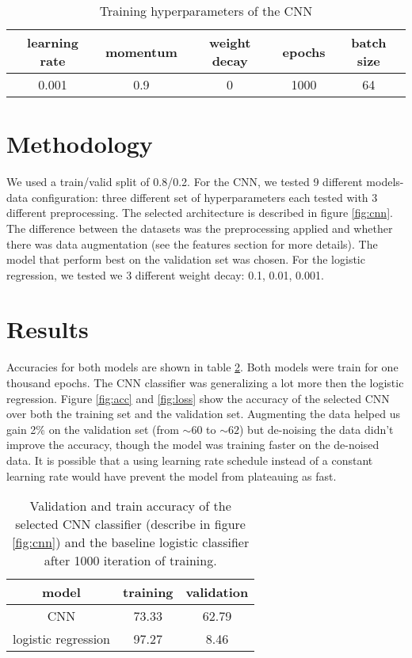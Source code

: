 \documentclass[12pt,english]{article}
\begin{document}
\begin{table}[h!]
	\centering
	\begin{tabular}{|c|c|c|c|c|}
		\hline 
		learning rate & momentum & weight decay & epochs & batch size \\ 
		\hline 
		0.001 & 0.9 & 0 & 1000 & 64\\
		\hline 
	\end{tabular} 
	\caption{Training hyperparameters of the CNN}
	\label{table:cnn_hyper}
\end{table}

\section{Methodology}
We used a train/valid split of 0.8/0.2. For the CNN, we tested 9 different models-data configuration: three different set of hyperparameters each tested with 3 different preprocessing. The selected architecture is described in figure \ref{fig:cnn}. The difference between the datasets was the preprocessing applied and whether there was data augmentation (see the features section for more details). The model that perform best on the validation set was chosen. For the logistic regression, we tested we 3 different weight decay: 0.1, 0.01, 0.001.

\section{Results}
Accuracies for both models are shown in table \ref{table:acc}. Both models were train for one thousand epochs. The CNN classifier was generalizing a lot more then the logistic regression. Figure \ref{fig:acc} and \ref{fig:loss} show the accuracy of the selected CNN over both the training set and the validation set. Augmenting the data helped us gain 2\% on the validation set (from $\sim 60$ to $\sim 62$) but de-noising the data didn't improve the accuracy, though the model was training faster on the de-noised data. It is possible that a using learning rate schedule instead of a constant learning rate would have prevent the model from plateauing as fast. 


\begin{table}[h!]
	\centering
	\begin{tabular}{|c|c|c|}
		\hline 
		model & training & validation\\ 
		\hline 
		CNN & 73.33 & 62.79 \\ 
		\hline 
		logistic regression & 97.27 & 8.46\\
		\hline
	\end{tabular} 
	\caption{Validation and train accuracy of the selected CNN classifier (describe in figure \ref{fig:cnn}) and the baseline logistic classifier after 1000 iteration of training.}
	\label{table:acc}
\end{table}
\end{document}
